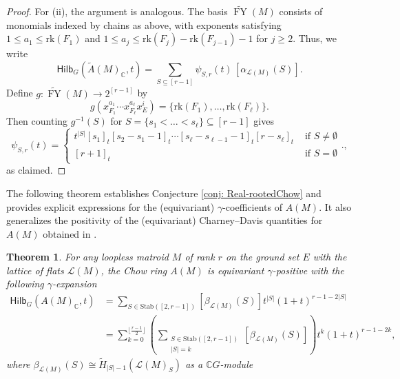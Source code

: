 \documentclass[reqno]{amsart}
\newcommand{\rk}{{\mathrm{rk}}}
\newcommand{\Stab}{{\mathrm{Stab}}}
\renewcommand{\L}{{\mathcal{L}}}
\newcommand{\Hilb}{{\mathsf{Hilb}}}
\newcommand{\floor}[1]{\lfloor #1 \rfloor}
\newcommand{\FY}{\operatorname{FY}}
\newtheorem{thm}{Theorem}[section]
\theoremstyle{definition}
\theoremstyle{remark}
\begin{document}
\begin{proof}
For (ii), the argument is analogous. The basis $\widetilde{\FY}(M)$ consists of monomials indexed by chains as above, with exponents satisfying
$1\le a_1\le \rk(F_1)$ and $1\le a_j\le \rk(F_j)-\rk(F_{j-1})-1$ for $j\ge 2$. 
Thus, we write
\[
\Hilb_G(\widetilde{A}(M)_{\mathbb{C}},t)
=\sum_{S\subseteq [r-1]} \psi_{S,r}(t)\,[\alpha_{\L(M)}(S)].
\]
Define $g:\widetilde{\FY}(M)\longrightarrow 2^{[r-1]}$ by
\[
g(x_{F_1}^{a_1}\cdots x_{F_\ell}^{a_\ell}x_E^i)
=\{\rk(F_1),\ldots,\rk(F_\ell)\}.
\]
Then counting $g^{-1}(S)$ for $S=\{s_1<\ldots<s_{\ell}\}\subseteq [r-1]$ gives 
\[
    \psi_{S,r}(t)=\begin{cases}
        t^{|S|}[s_1]_t[s_2-s_1-1]_t\cdots[s_{\ell}-s_{\ell-1}-1]_t[r-s_{\ell}]_t & \text{ if }S\neq \emptyset\\
        [r+1]_t & \text{ if } S=\emptyset
    \end{cases}.,
\]
as claimed.
\end{proof}

The following theorem establishes Conjecture \ref{conj: Real-rootedChow} and provides explicit expressions for the (equivariant) $\gamma$-coefficients of $A(M)$. It also generalizes the positivity of the (equivariant) Charney--Davis quantities for $A(M)$ obtained in \cite[Lemma~4.9]{Liao2023Two}.


\begin{thm} \label{thm:GammaChow}
For any loopless matroid $M$ of rank $r$ on the ground set $E$ with the lattice of flats $\L(M)$, the Chow ring $A(M)$ is equivariant $\gamma$-positive with the following $\gamma$-expansion
\begin{align*}
    \Hilb_{G}(A(M)_{\mathbb{C}},t) 
    &=\sum_{S\in\Stab([2,r-1])}[\beta_{\L(M)}(S)] t^{|S|}(1+t)^{r-1-2|S|}\\
    &=\sum_{k=0}^{\floor{\frac{r-1}{2}}}\left(\sum_{\substack{S\in\Stab([2,r-1])\\ |S|=k}}[\beta_{\L(M)}(S)]\right)t^k(1+t)^{r-1-2k},
\end{align*}
where $\beta_{\L(M)}(S)\cong \tilde{H}_{|S|-1}(\L(M)_S)$ as a $\mathbb{C}G$-module
\end{thm}
\end{document}
